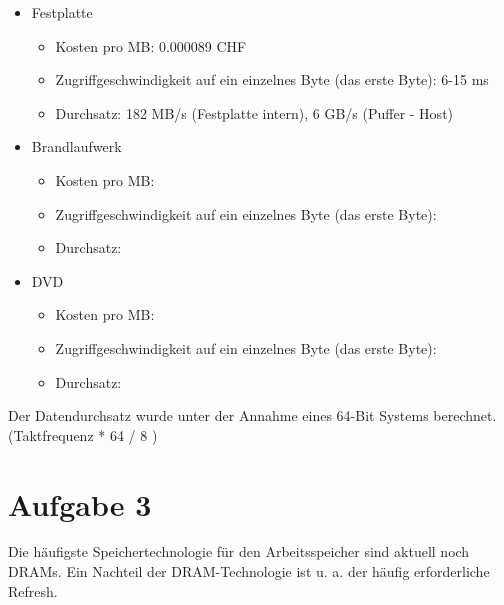 \documentclass[10pt]{article}
\begin{document}
\begin{enumerate}[label=\alph*)]
\begin{itemize}
					
				\item Festplatte
					\begin{itemize}
						\item Kosten pro MB: 0.000089 CHF
						\item Zugriffgeschwindigkeit auf ein einzelnes Byte (das erste Byte): 6-15 ms
						\item Durchsatz: 182 MB/s (Festplatte intern), 6 GB/s (Puffer - Host)
					\end{itemize}
				\item Brandlaufwerk
					\begin{itemize}
						\item Kosten pro MB:
						\item Zugriffgeschwindigkeit auf ein einzelnes Byte (das erste Byte):
						\item Durchsatz:
					\end{itemize}
				\item DVD
					\begin{itemize}
						\item Kosten pro MB:
						\item Zugriffgeschwindigkeit auf ein einzelnes Byte (das erste Byte):
						\item Durchsatz:
					\end{itemize}
			\end{itemize}	
			Der Datendurchsatz wurde unter der Annahme eines 64-Bit Systems berechnet. (Taktfrequenz * 64 / 8 )

\end{enumerate}

\newpage
\section*{Aufgabe 3}
Die häufigste Speichertechnologie für den Arbeitsspeicher sind aktuell noch DRAMs. Ein Nachteil der DRAM-Technologie ist u. a. der häufig erforderliche Refresh.
\end{document}
